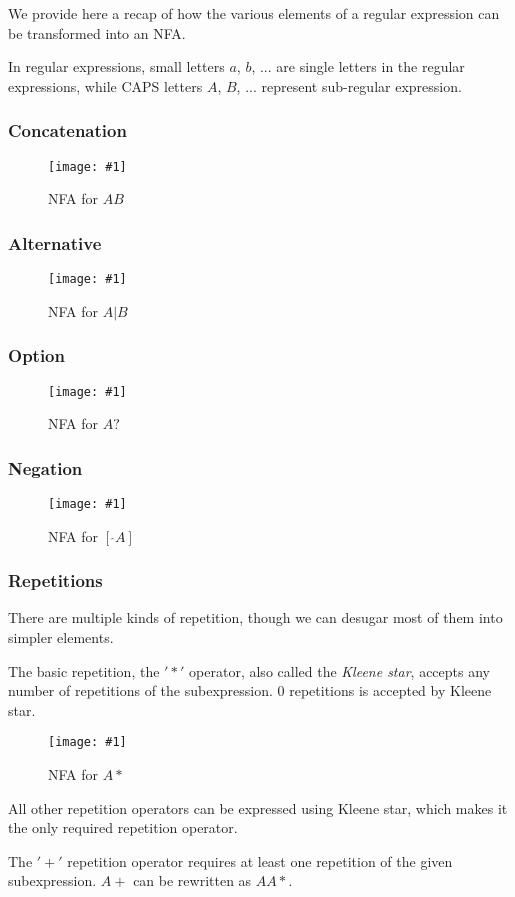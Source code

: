 \documentclass[11pt,a4paper]{report}
\newcommand{\regexp}[1]{$#1$}
\newcommand{\insertfa}[3]{
\begin{figure}[h!]
	\centering
	\texttt{[image: \#1]}
	\caption{#2}
\end{figure}
}
\newcommand{\smallnfa}[2]{\insertfa{./img/nfa/#1.png}{NFA for #2}{scale=0.7}}
\begin{document}
\label{regexptonfa}

We provide here a recap of how the various elements of a regular expression can be transformed into an NFA.

In regular expressions, small letters $a$, $b$, ... are single letters in the regular expressions, while CAPS letters $A$, $B$, ... represent sub-regular expression.

\subsubsection{Concatenation}

\smallnfa{concat}{\regexp{AB}}

\subsubsection{Alternative}

\smallnfa{alt}{\regexp{A|B}}

\subsubsection{Option}

\smallnfa{option}{\regexp{A?}}

\subsubsection{Negation}

\smallnfa{neg}{\regexp{[\ \hat{} A]}}

\subsubsection{Repetitions}

There are multiple kinds of repetition, though we can desugar most of them into simpler elements.

The basic repetition, the $'*'$ operator, also called the \textit{Kleene star}, accepts any number of repetitions of the subexpression. 0 repetitions is accepted by Kleene star.

\smallnfa{kleene-star}{\regexp{A*}}

All other repetition operators can be expressed using Kleene star, which makes it the only required repetition operator.

The $'+'$ repetition operator requires at least one repetition of the given subexpression. \regexp{A+} can be rewritten as \regexp{AA*}.
\end{document}
